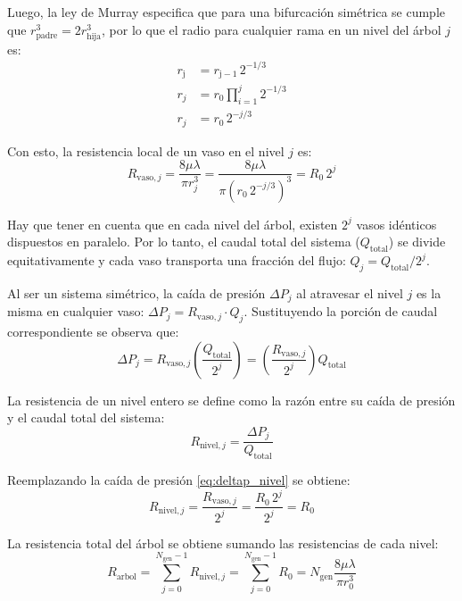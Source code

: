 \documentclass[12pt, letterpaper]{article}
\begin{document}
Luego, la ley de Murray especifica que para una bifurcación simétrica se cumple que $r_{\mathrm{padre}}^3 = 2 r_{\mathrm{hija}}^3$, por lo que el radio para cualquier rama en un nivel del árbol $j$ es:
\begin{align}
  r_{\mathrm{j}} &= r_{\mathrm{j-1}} \, 2^{-1/3} \nonumber \\
  r_j &= r_0 \prod_{i=1}^{j} 2^{-1/3} \nonumber \\
  r_j &= r_0 \, 2^{-j/3} \label{eq:radio_generacion}
\end{align}

Con esto, la resistencia local de un vaso en el nivel $j$ es:
\begin{equation}
  R_{\mathrm{vaso}, j} = \frac{8 \mu \lambda}{\pi r_j^3} = \frac{8 \mu \lambda}{\pi \left(r_0 \, 2^{-j/3}\right)^3} = R_0 \, 2^j
\end{equation}

Hay que tener en cuenta que en cada nivel del árbol, existen $2^j$ vasos idénticos dispuestos en paralelo. Por lo tanto, el caudal total del sistema ($Q_{\mathrm{total}}$) se divide equitativamente y cada vaso transporta una fracción del flujo: $Q_j = Q_{\mathrm{total}} / 2^j$.

Al ser un sistema simétrico, la caída de presión $\Delta P_j$ al atravesar el nivel $j$ es la misma en cualquier vaso: $\Delta P_j = R_{\mathrm{vaso}, j} \cdot Q_j$. Sustituyendo la porción de caudal correspondiente se observa que:
\begin{equation} \label{eq:deltap_nivel}
  \Delta P_j = R_{\mathrm{vaso}, j} \left( \frac{Q_{\mathrm{total}}}{2^j} \right) = \left( \frac{R_{\mathrm{vaso}, j}}{2^j} \right) Q_{\mathrm{total}}
\end{equation}

La resistencia de un nivel entero se define como la razón entre su caída de presión y el caudal total del sistema: 
\begin{equation} \label{eq:resistencia_nivel}
  R_{\mathrm{nivel}, j} = \frac{\Delta P_j}{Q_{\mathrm{total}}}
\end{equation}

Reemplazando la caída de presión \eqref{eq:deltap_nivel} se obtiene:
\begin{equation}
  R_{\mathrm{nivel}, j} = \frac{R_{\mathrm{vaso}, j}}{2^j} = \frac{R_0 \, 2^j}{2^j} = R_0
\end{equation}

La resistencia total del árbol se obtiene sumando las resistencias de cada nivel:
\begin{equation}\label{eq:resistencia_arbol}
  R_{\mathrm{arbol}} = \sum_{j=0}^{N_{\mathrm{gen}}-1} R_{\mathrm{nivel}, j} = \sum_{j=0}^{N_{\mathrm{gen}}-1} R_0  = N_{\mathrm{gen}} \frac{8 \mu \lambda}{\pi r_0^3}
\end{equation}
\end{document}
